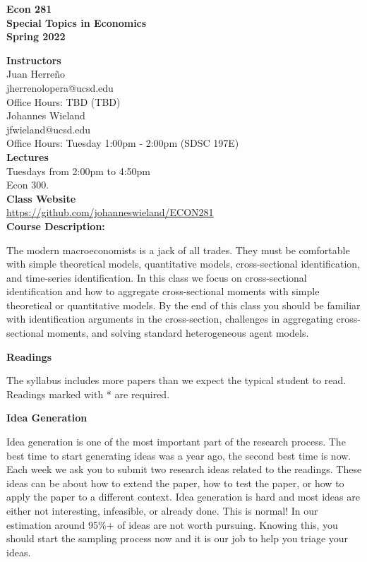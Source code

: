 \documentclass [12pt]{article}
\begin{document}
\begin{center}
\textbf{Econ 281\\
Special Topics in Economics\\
Spring 2022}
\end{center}


\noindent \textbf{Instructors} \\
Juan Herre\~no\\ 
jherrenolopera@ucsd.edu\\
Office Hours: TBD (TBD)\\

\noindent Johannes Wieland\\ 
jfwieland@ucsd.edu\\
Office Hours: Tuesday 1:00pm - 2:00pm  (SDSC 197E)\\


\noindent \textbf{Lectures} \\
Tuesdays from 2:00pm to 4:50pm \\
Econ 300.\\

\noindent \textbf{Class Website} \\
\href{https://github.com/johanneswieland/ECON281}{https://github.com/johanneswieland/ECON281} \\


\noindent \textbf{Course Description:} 

The modern macroeconomists is a jack of all trades. They must be comfortable with simple theoretical models, quantitative models, cross-sectional identification, and time-series identification. In this class we focus on cross-sectional identification and how to aggregate cross-sectional moments with simple theoretical or quantitative models. By the end of this class you should be familiar with identification arguments in the cross-section, challenges in aggregating cross-sectional moments, and solving standard heterogeneous agent models.



\noindent  \textbf{Readings}



\noindent The syllabus includes more papers than we expect the typical student to read. Readings marked with * are required.


\noindent  \textbf{Idea Generation}

Idea generation is one of the most important part of the research process. The best time to start generating ideas was a year ago, the second best time is now. Each week we ask you to submit two research ideas related to the readings. These ideas can be about how to extend the paper, how to test the paper, or how to apply the paper to a different context. Idea generation is hard and most ideas are either not interesting, infeasible, or already done. This is normal! In our estimation around 95\%+ of ideas are not worth pursuing. Knowing this, you should start the sampling process now and it is our job to help you triage your ideas.
\end{document}
